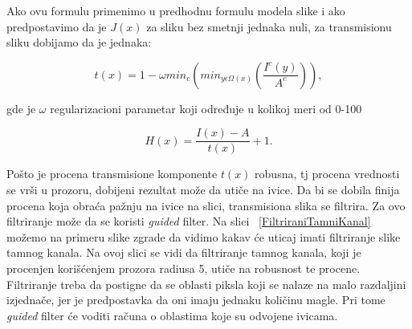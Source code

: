 \documentclass[a4paper,12pt,titlepage]{article}
\begin{document}
Ako ovu formulu primenimo u predhodnu formulu modela slike i ako predpostavimo da je $J(x)$ za sliku bez smetnji jednaka nuli, za transmisionu sliku dobijamo da je jednaka:

\begin{equation}\label{eq:haze3}
t(x) = 1 - \omega min_c ( min_{y \epsilon \Omega (x)} (\dfrac{I^c(y)}{A^c})),
\end{equation}

gde je $\omega$ regularizacioni parametar koji određuje u kolikoj meri od 0-100 %

\begin{equation}\label{eq:haze3}
H(x) = \dfrac{I(x) - A}{t(x)} + 1.
\end{equation}

Pošto je procena transmisione komponente $t(x)$ robusna, tj procena vrednosti  se vrši u prozoru, dobijeni rezultat može da utiče na ivice. Da bi se dobila finija procena koja obraća pažnju na ivice na slici, transmisiona slika se filtrira. Za ovo filtriranje može da se koristi \emph{guided} filter. Na slici ~\ref{FiltriraniTamniKanal} možemo na primeru slike zgrade da vidimo kakav će uticaj imati filtriranje slike tamnog kanala. Na ovoj slici se vidi da filtriranje tamnog kanala, koji je procenjen korišćenjem prozora radiusa 5, utiče na robusnost te procene. Filtriranje treba da postigne da se oblasti piksla koji se nalaze na malo razdaljini izjednače, jer je predpostavka da oni imaju jednaku količinu magle. Pri tome \emph{guided} filter će voditi računa o oblastima koje su odvojene ivicama. 
\end{document}
